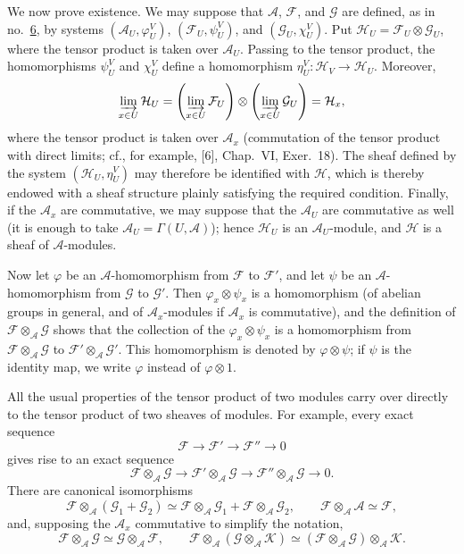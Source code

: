 We now prove existence. We may suppose that $\mathcal{A}$, $\mathcal{F}$, and $\mathcal{G}$ are defined, as in no.~\hyperref[fac:I:1:no:6]{6}, by systems $(\mathcal{A}_U,\varphi_U^V)$, $(\mathcal{F}_U,\psi_U^V)$, and $(\mathcal{G}_U,\chi_U^V)$. Put $\mathcal{H}_U=\mathcal{F}_U\otimes\mathcal{G}_U$, where the tensor product is taken over $\mathcal{A}_U$. Passing to the tensor product, the homomorphisms $\psi_U^V$ and $\chi_U^V$ define a homomorphism $\eta_U^V:\mathcal{H}_V\to\mathcal{H}_U$. Moreover,
\[
\varinjlim_{x\in U}\mathcal{H}_U
=\left(\varinjlim_{x\in U}\mathcal{F}_U\right)
 \otimes
 \left(\varinjlim_{x\in U}\mathcal{G}_U\right)
=\mathcal{H}_x,
\]
where the tensor product is taken over $\mathcal{A}_x$ (commutation of the tensor product with direct limits; cf., for example, [6], Chap.~VI, Exer.~18). The sheaf defined by the system $(\mathcal{H}_U,\eta_U^V)$ may therefore be identified with $\mathcal{H}$, which is thereby endowed with a sheaf structure plainly satisfying the required condition. Finally, if the $\mathcal{A}_x$ are commutative, we may suppose that the $\mathcal{A}_U$ are commutative as well (it is enough to take $\mathcal{A}_U=\Gamma(U,\mathcal{A})$); hence $\mathcal{H}_U$ is an $\mathcal{A}_U$-module, and $\mathcal{H}$ is a sheaf of $\mathcal{A}$-modules.

Now let $\varphi$ be an $\mathcal{A}$-homomorphism from $\mathcal{F}$ to $\mathcal{F}'$, and let $\psi$ be an $\mathcal{A}$-homomorphism from $\mathcal{G}$ to $\mathcal{G}'$. Then $\varphi_x\otimes\psi_x$ is a homomorphism (of abelian groups in general, and of $\mathcal{A}_x$-modules if $\mathcal{A}_x$ is commutative), and the definition of $\mathcal{F}\otimes_{\mathcal{A}}\mathcal{G}$ shows that the collection of the $\varphi_x\otimes\psi_x$ is a homomorphism from $\mathcal{F}\otimes_{\mathcal{A}}\mathcal{G}$ to $\mathcal{F}'\otimes_{\mathcal{A}}\mathcal{G}'$. This homomorphism is denoted by $\varphi\otimes\psi$; if $\psi$ is the identity map, we write $\varphi$ instead of $\varphi\otimes 1$.

All the usual properties of the tensor product of two modules carry over directly to the tensor product of two sheaves of modules. For example, every exact sequence
\[
\mathcal{F}\longrightarrow\mathcal{F}'\longrightarrow\mathcal{F}''\longrightarrow 0
\]
gives rise to an exact sequence
\[
\mathcal{F}\otimes_{\mathcal{A}}\mathcal{G}
\longrightarrow\mathcal{F}'\otimes_{\mathcal{A}}\mathcal{G}
\longrightarrow\mathcal{F}''\otimes_{\mathcal{A}}\mathcal{G}
\longrightarrow 0.
\]
There are canonical isomorphisms
\[
\mathcal{F}\otimes_{\mathcal{A}}(\mathcal{G}_1+\mathcal{G}_2)
\simeq
\mathcal{F}\otimes_{\mathcal{A}}\mathcal{G}_1
+\mathcal{F}\otimes_{\mathcal{A}}\mathcal{G}_2,
\qquad
\mathcal{F}\otimes_{\mathcal{A}}\mathcal{A}\simeq\mathcal{F},
\]
and, supposing the $\mathcal{A}_x$ commutative to simplify the notation,
\[
\mathcal{F}\otimes_{\mathcal{A}}\mathcal{G}
\simeq\mathcal{G}\otimes_{\mathcal{A}}\mathcal{F},
\qquad
\mathcal{F}\otimes_{\mathcal{A}}
  (\mathcal{G}\otimes_{\mathcal{A}}\mathcal{K})
\simeq
(\mathcal{F}\otimes_{\mathcal{A}}\mathcal{G})
  \otimes_{\mathcal{A}}\mathcal{K}.
\]
